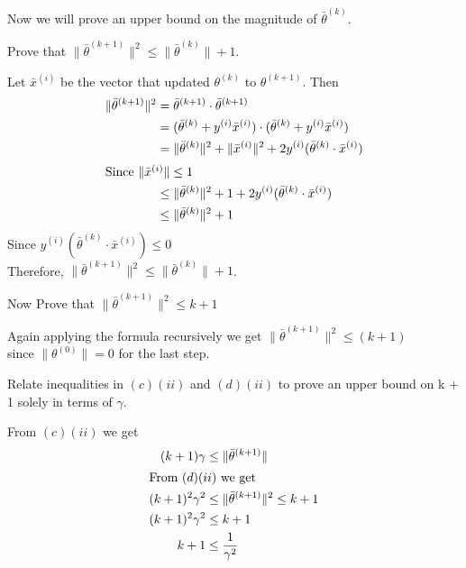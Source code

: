 \documentclass[12pt, letterpaper]{article}
\newcounter{subsubproblemcounter}
\newenvironment{subsubproblem}[1]{%
  \begin{sspb}{#1}
    }{
  \end{sspb}
}
\begin{document}
\begin{subproblem}{}
    Now we will prove an upper bound on the magnitude of $\bar{\theta}^{(k)}$.
\end{subproblem}
\setcounter{subsubproblemcounter}{0}
\begin{subsubproblem}{}
    Prove that $\|\bar{\theta}^{(k+1)}\|^2 \leq \|\bar{\theta}^{(k)} \| + 1$.
\end{subsubproblem}
\begin{problemproof}
    Let $\bar{x}^{(i)}$ be the vector that updated $\theta^{(k)}$ to $\theta^{(k+1)}$. Then
    \begin{align*}
        \|\bar{\theta}^{(k+1)}\|^2 
        &= \bar{\theta}^{(k+1)} \cdot \bar{\theta}^{(k+1)}\\
        &= (\bar{\theta}^{(k)} + y^{(i)}\bar{x}^{(i)}) \cdot (\bar{\theta}^{(k)} + y^{(i)}\bar{x}^{(i)})\\
        &= \|\bar{\theta}^{(k)}\|^2 + \|\bar{x}^{(i)}\|^2 + 2y^{(i)}(\bar{\theta}^{(k)} \cdot \bar{x}^{(i)})\\
        \intertext{Since $\|\bar{x}^{(i)}\| \leq 1$}
        &\leq \|\bar{\theta}^{(k)}\|^2 + 1 + 2y^{(i)}(\bar{\theta}^{(k)} \cdot \bar{x}^{(i)})\\
        &\leq \|\bar{\theta}^{(k)}\|^2 + 1
    \end{align*}
    Since $y^{(i)}(\bar{\theta}^{(k)} \cdot \bar{x}^{(i)}) \leq 0$\\
    Therefore, $\|\bar{\theta}^{(k+1)}\|^2 \leq \|\bar{\theta}^{(k)} \| + 1$.
\end{problemproof}
\begin{subsubproblem}{}
    Now Prove that $\| \bar{\theta}^{(k+1)} \|^2 \leq k+1$
\end{subsubproblem}
\begin{problemproof}
    Again applying the formula recursively we get $\|\bar{\theta}^{(k+1)}\|^2 \leq (k+1)$\\ 
    since $\|\theta^{(0)}\|=0$ for the last step.
\end{problemproof}

\begin{subproblem}{}
    Relate inequalities in $(c)(ii)$ and $(d)(ii)$ to prove an upper bound on k + 1 solely in terms of $\gamma$.
\end{subproblem}
\begin{problemproof}
    From $(c)(ii)$ we get
    \begin{align*}
        (k+1)\gamma &\leq \|\bar{\theta}^{(k+1)}\|\\
        \intertext{From $(d)(ii)$ we get}
        (k+1)^2 \gamma^2 &\leq \|\bar{\theta}^{(k+1)}\|^2 \leq k+1\\
        (k+1)^2 \gamma^2 &\leq k+1\\
        k + 1 &\leq \frac{1}{\gamma^2}
    \end{align*}
\end{problemproof}
\end{document}
